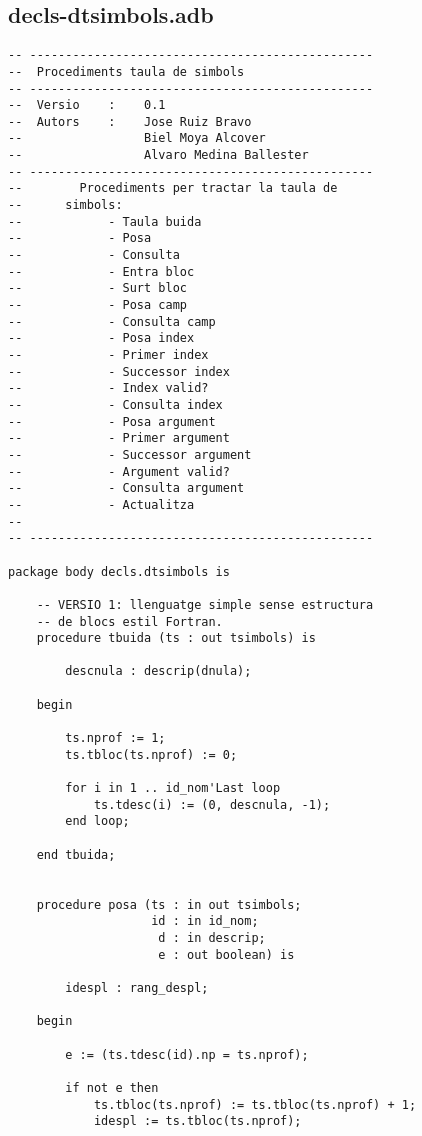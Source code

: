 \documentclass[10pt]{report}
\begin{document}
    \subsection{decls-dtsimbols.adb}
    \begin{lstlisting}[style=Ada]
-- ------------------------------------------------
--  Procediments taula de simbols
-- ------------------------------------------------
--  Versio    :    0.1
--  Autors    :    Jose Ruiz Bravo
--                 Biel Moya Alcover
--                 Alvaro Medina Ballester
-- ------------------------------------------------
--        Procediments per tractar la taula de
--      simbols:
--            - Taula buida
--            - Posa
--            - Consulta
--            - Entra bloc
--            - Surt bloc
--            - Posa camp
--            - Consulta camp
--            - Posa index
--            - Primer index
--            - Successor index
--            - Index valid?
--            - Consulta index
--            - Posa argument
--            - Primer argument
--            - Successor argument
--            - Argument valid?
--            - Consulta argument
--            - Actualitza
--
-- ------------------------------------------------

package body decls.dtsimbols is

    -- VERSIO 1: llenguatge simple sense estructura 
    -- de blocs estil Fortran.
    procedure tbuida (ts : out tsimbols) is
    
        descnula : descrip(dnula);
        
    begin
        
        ts.nprof := 1;
        ts.tbloc(ts.nprof) := 0;
        
        for i in 1 .. id_nom'Last loop
            ts.tdesc(i) := (0, descnula, -1);
        end loop;
    
    end tbuida;
    
    
    procedure posa (ts : in out tsimbols;
                    id : in id_nom;
                     d : in descrip;
                     e : out boolean) is
                      
        idespl : rang_despl;
    
    begin
    
        e := (ts.tdesc(id).np = ts.nprof);
        
        if not e then
            ts.tbloc(ts.nprof) := ts.tbloc(ts.nprof) + 1;
            idespl := ts.tbloc(ts.nprof);
            

\end{lstlisting}
\end{document}
